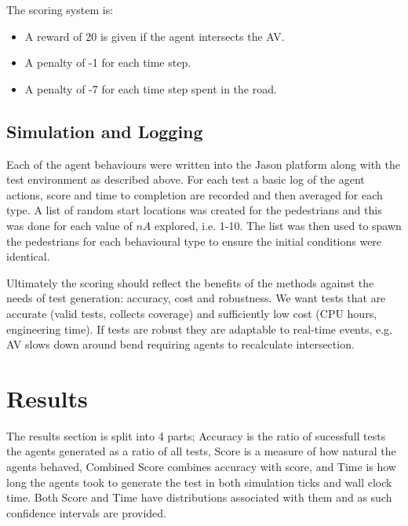 \documentclass[letterpaper, 10 pt, journal, twoside]{IEEEtran}
\begin{document}
The scoring system is:
\begin{itemize}
  \item A reward of 20 is given if the agent intersects the AV.
  \item A penalty of -1 for each time step.
  \item A penalty of -7 for each time step spent in the road.
\end{itemize}


\subsection{Simulation and Logging}
Each of the agent behaviours were written into the Jason platform along with the test environment as described above. For each test a basic log of the agent actions, score and time to completion are recorded and then averaged for each type. A list of random start locations was created for the pedestrians and this was done for each value of $nA$ explored, i.e. 1-10. The list was then used to spawn the pedestrians for each behavioural type to ensure the initial conditions were identical.

Ultimately the scoring should reflect the benefits of the methods against the needs of test generation: accuracy, cost and robustness. We want tests that are accurate (valid tests, collects coverage) and sufficiently low cost (CPU hours, engineering time). If tests are robust they are adaptable to real-time events, e.g. AV slows down around bend requiring agents to recalculate intersection.





\section{Results}
The results section is split into 4 parts; Accuracy is the ratio of sucessfull tests the agents generated as a ratio of all tests, Score is a measure of how natural the agents behaved, Combined Score combines accuracy with score, and Time is how long the agents took to generate the test in both simulation ticks and wall clock time. Both Score and Time have distributions associated with them and as such confidence intervals are provided.
\end{document}
